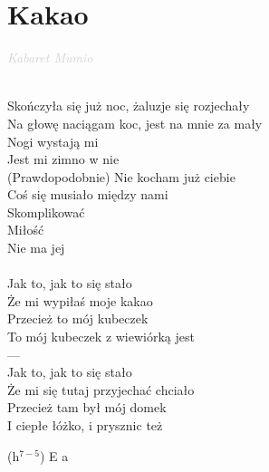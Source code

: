 \documentclass[a5paper, 10pt]{book}
\begin{document}
\section{Kakao}\textcolor{lightgray}{\textit{Kabaret Mumio}}\\~\\
\begin{minipage}[t]{0.8\textwidth}
Skończyła się już noc, żaluzje się rozjechały\\
Na głowę naciągam koc, jest na mnie za mały\\
Nogi wystają mi\\
Jest mi zimno w nie\\
(Prawdopodobnie) Nie kocham już ciebie\\

Coś się musiało między nami\\
Skomplikować\\
Miłość\\
Nie ma jej\\
\\
\hspace*{5mm}Jak to, jak to się stało\\
\hspace*{5mm}Że mi wypiłaś moje kakao\\
\hspace*{5mm}Przecież to mój kubeczek\\
\hspace*{5mm}To mój kubeczek z wiewiórką jest\\

---\\

\hspace*{5mm}Jak to, jak to się stało\\
\hspace*{5mm}Że mi się tutaj przyjechać chciało\\
\hspace*{5mm}Przecież tam był mój domek\\
\hspace*{5mm}I ciepłe łóżko, i prysznic też\\
\end{minipage}
\begin{minipage}[t]{0.2\textwidth}
(h$^{7-5}$) E a\\
\\
\\
\\
\end{minipage}
\end{document}
